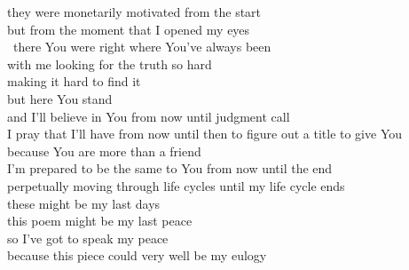 \begin{Parallel}{0.48\textwidth}{0.48\textwidth}
{they were monetarily motivated from the start\\
but from the moment that I opened my eyes\\
\-\ \indent \indent there You were right where You’ve always been\\
with me looking for the truth so hard\\
making it hard to find it\\
but here You stand\\
and I’ll believe in You from now until judgment call\\
I pray that I’ll have from now until then to figure out a title to give You\\
because You are more than a friend\\
I’m prepared to be the same to You from now until the end\\
perpetually moving through life cycles until my life cycle ends\\
these might be my last days\\
this poem might be my last peace\\
so I’ve got to speak my peace\\
because this piece could very well be my eulogy}
\ParallelPar
\end{Parallel}
\vfill
\hspace{0pt}